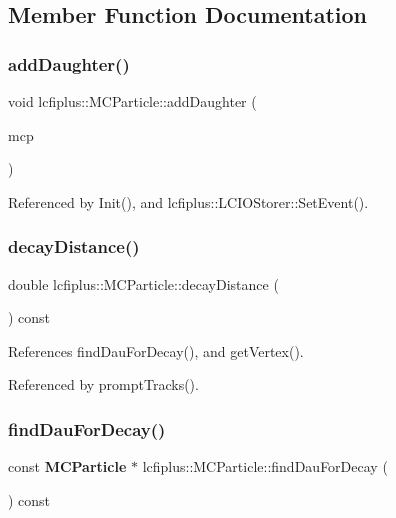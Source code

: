 \subsection{Member Function Documentation}
\mbox{\label{classlcfiplus_1_1MCParticle_a0924073bf956ff336ee780f3c069431e}} 
\subsubsection{add\+Daughter()}
{\footnotesize\ttfamily void lcfiplus\+::\+M\+C\+Particle\+::add\+Daughter (\begin{DoxyParamCaption}\item[{const \textbf{ M\+C\+Particle} $\ast$}]{mcp }\end{DoxyParamCaption})}



Referenced by Init(), and lcfiplus\+::\+L\+C\+I\+O\+Storer\+::\+Set\+Event().

\mbox{\label{classlcfiplus_1_1MCParticle_a1f32d0fa4fa25c97aa3395b595787fb7}} 
\subsubsection{decay\+Distance()}
{\footnotesize\ttfamily double lcfiplus\+::\+M\+C\+Particle\+::decay\+Distance (\begin{DoxyParamCaption}{ }\end{DoxyParamCaption}) const}



References find\+Dau\+For\+Decay(), and get\+Vertex().



Referenced by prompt\+Tracks().

\mbox{\label{classlcfiplus_1_1MCParticle_a668d22ef6d5eed802711f5e8ff19c722}} 
\subsubsection{find\+Dau\+For\+Decay()}
{\footnotesize\ttfamily const \textbf{ M\+C\+Particle} $\ast$ lcfiplus\+::\+M\+C\+Particle\+::find\+Dau\+For\+Decay (\begin{DoxyParamCaption}{ }\end{DoxyParamCaption}) const}



